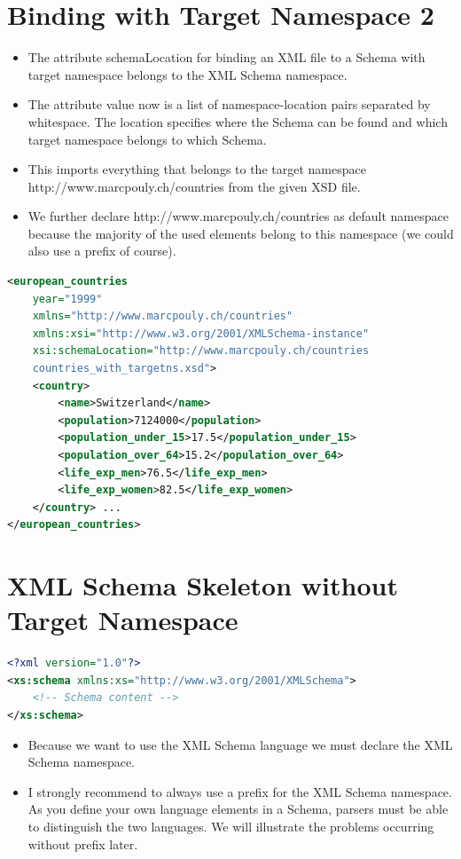 \section{Binding with Target Namespace 2}
\begin{itemize}
\item The attribute schemaLocation for binding an XML file to a Schema with target namespace belongs to the XML Schema namespace.
\item The attribute value now is a list of namespace-location pairs separated by whitespace. The location specifies where the Schema can be found and which target namespace belongs to which Schema.
\item This imports everything that belongs to the target namespace http://www.marcpouly.ch/countries from the given XSD file.
\item We further declare http://www.marcpouly.ch/countries as default namespace because the majority of the used elements belong to this namespace (we could also use a prefix of course).
\end{itemize}
\begin{lstlisting}[language=XML, caption={Binding with Target Namespace 2}]
<european_countries 
	year="1999" 
	xmlns="http://www.marcpouly.ch/countries" 
	xmlns:xsi="http://www.w3.org/2001/XMLSchema-instance"
	xsi:schemaLocation="http://www.marcpouly.ch/countries 
	countries_with_targetns.xsd">
	<country>
		<name>Switzerland</name> 
		<population>7124000</population> 
		<population_under_15>17.5</population_under_15> 
		<population_over_64>15.2</population_over_64> 
		<life_exp_men>76.5</life_exp_men> 
		<life_exp_women>82.5</life_exp_women>
	</country> ...
</european_countries>
\end{lstlisting}

\section{XML Schema Skeleton without Target Namespace}
\begin{lstlisting}[language=XML, caption={XML Schema Skeleton without Target Namespace}]
<?xml version="1.0"?>
<xs:schema xmlns:xs="http://www.w3.org/2001/XMLSchema">
	<!-- Schema content --> 
</xs:schema>
\end{lstlisting}
\begin{itemize}
\item Because we want to use the XML Schema language we must declare the XML Schema namespace.
\item I strongly recommend to always use a prefix for the XML Schema namespace. As you define your own language elements in a Schema, parsers must be able to distinguish the two languages. We will illustrate the problems occurring without prefix later.
\end{itemize}

